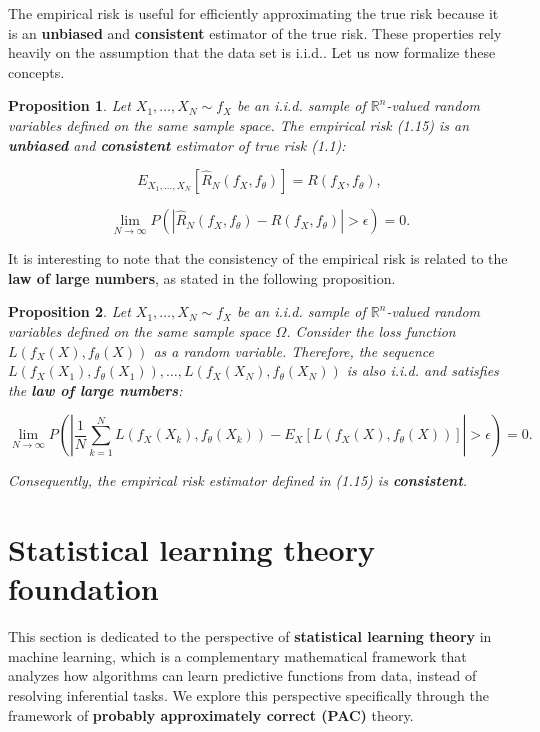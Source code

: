 \documentclass{report}
\newtheorem{proposition}{Proposition}[chapter]
\begin{document}
The empirical risk is useful for efficiently approximating the true risk because it is an \textbf{unbiased} and \textbf{consistent} estimator of the true risk. These properties rely heavily on the assumption that the data set is i.i.d.. Let us now formalize these concepts.

\begin{proposition}
Let $X_1,\dots,X_N \sim f_X$ be an i.i.d. sample of $\mathbb{R}^n$-valued random variables defined on the same sample space. The empirical risk (1.15) is an \textbf{unbiased} and \textbf{consistent} estimator of true risk (1.1):

\begin{equation}
E_{X_1,...,X_N}[\hat{R}_N(f_X,f_\theta)] = R(f_X,f_\theta),
\end{equation}

\begin{equation}
\lim_{N\to \infty}P(|\hat{R}_N(f_X,f_\theta)-R(f_X,f_\theta)| > \epsilon) = 0.
\end{equation}
\end{proposition}

It is interesting to note that the consistency of the empirical risk is related to the \textbf{law of large numbers}, as stated in the following proposition.

\begin{proposition}
Let $X_1,\dots,X_N \sim f_X$ be an i.i.d. sample of $\mathbb{R}^n$-valued random variables defined on the same sample space $\Omega$. Consider the loss function $L(f_X(X), f_\theta(X))$ as a random variable. Therefore, the sequence $L(f_X(X_1),f_\theta(X_1)),\dots,L(f_X(X_N),f_\theta(X_N))$ is also i.i.d. and satisfies the \textbf{law of large numbers}:

\begin{equation}
\lim_{N\to \infty}P\left(\left|\frac{1}{N}\sum_{k=1}^NL(f_X(X_k),f_\theta(X_k)) - E_{X}[L(f_X(X),f_\theta(X))]\right| > \epsilon\right) = 0.
\end{equation}

Consequently, the empirical risk estimator defined in (1.15) is \textbf{consistent}.
\end{proposition}

\section{Statistical learning theory foundation}
This section is dedicated to the perspective of \textbf{statistical learning theory} in machine learning, which is a complementary mathematical framework that analyzes how algorithms can learn predictive functions from data, instead of resolving inferential tasks. We explore this perspective specifically through the framework of \textbf{probably approximately correct (PAC)} theory.
\end{document}
